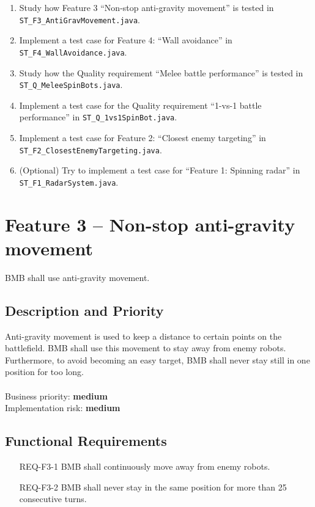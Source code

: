 \documentclass{scrreprt}
\begin{document}
\begin{enumerate}
\item Study how Feature 3 ``Non-stop anti-gravity movement'' is tested in\\ \texttt{ST_F3_AntiGravMovement.java}.
\item Implement a test case for Feature 4: ``Wall avoidance'' in\\ \texttt{ST_F4_WallAvoidance.java}.
\item Study how the Quality requirement ``Melee battle performance'' is tested in\\ \texttt{ST_Q_MeleeSpinBots.java}.
\item Implement a test case for the Quality requirement ``1-vs-1 battle performance'' in \texttt{ST_Q_1vs1SpinBot.java}.
\item Implement a test case for Feature 2: ``Closest enemy targeting'' in\\ \texttt{ST_F2_ClosestEnemyTargeting.java}.
\item (Optional) Try to implement a test case for ``Feature 1: Spinning radar'' in\\ \texttt{ST_F1_RadarSystem.java}.
\end{enumerate}

\section{Feature 3 -- Non-stop anti-gravity movement}
BMB shall use anti-gravity movement.
	
\subsection{Description and Priority}
Anti-gravity movement is used to keep a distance to certain points on the battlefield. BMB shall use this movement to stay away from enemy robots. Furthermore, to avoid becoming an easy target, BMB shall never stay still in one position for too long.\\\\Business priority: \textbf{medium}\\
Implementation risk: \textbf{medium}

\subsection{Functional Requirements}
\begin{itemize}
\item[REQ-F3-1] BMB shall continuously move away from enemy robots.
\item[REQ-F3-2] BMB shall never stay in the same position for more than 25 consecutive turns.
\end{itemize}
\end{document}
